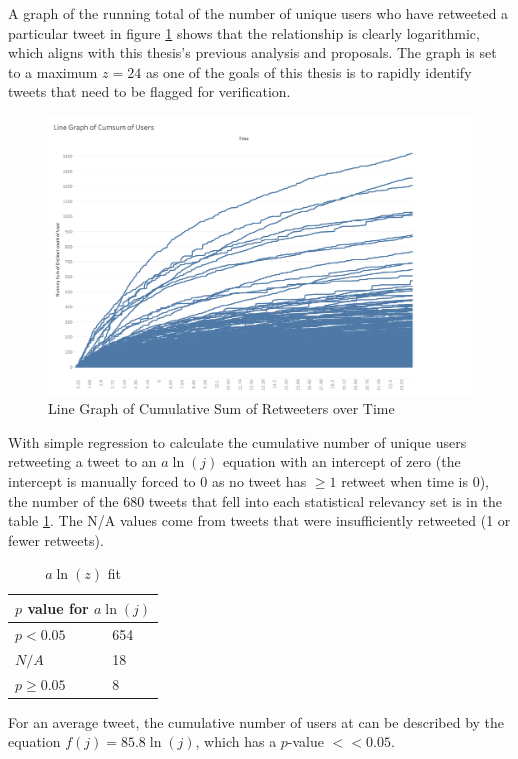 \documentclass[preprint,review,12pt]{elsarticle}
\begin{document}
 
A graph of the running total of the number of unique users who have retweeted a particular tweet in figure \ref{fig:Users CumSum/Time} shows that the relationship is clearly logarithmic, which aligns with this thesis's previous analysis and proposals. The graph is set to a maximum $z = 24$ as one of the goals of this thesis is to rapidly identify tweets that need to be flagged for verification.
\begin{figure}[h!]
 \centering
  \includegraphics[width=12cm]{Linegraph cumsum users.png}
  \caption{Line Graph of Cumulative Sum of Retweeters over Time}\label{fig:Users CumSum/Time}
 \end{figure}

With simple regression to calculate the cumulative number of unique users retweeting a tweet to an $a\ln(j)$ equation with an intercept of zero (the intercept is manually forced to 0 as no tweet has $\geq 1$ retweet when time is 0), the number of the 680 tweets that fell into each statistical relevancy set is in the table \ref{Natural Log Fit}. The N/A values come from tweets that were insufficiently retweeted (1 or fewer retweets).   
\begin{table}[h!]
\centering
\begin{tabular}{ |p{3cm}|p{3cm}|  }
\hline
\multicolumn{2}{|c|}{$p$ value for $a\ln(j)$} \\
\hline
$p < 0.05$  & 654\\
$N/A$ & 18 \\
$ p \geq 0.05$ & 8 \\
\hline
\end{tabular}
\caption{$a\ln(z)$ fit}
\label{Natural Log Fit}
\end{table}

For an average tweet, the cumulative number of users at can be described by the equation $f(j)=85.8\ln(j)$, which has a $p$-value $<< 0.05$. 
\end{document}
